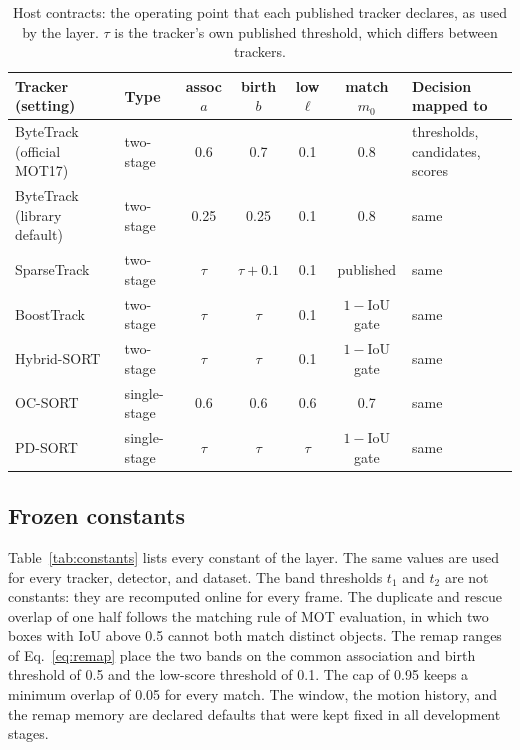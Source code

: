\documentclass[pdflatex,sn-mathphys-num,iicol]{sn-jnl}
\begin{document}
\begin{table}[t]
\caption{Host contracts: the operating point that each published tracker
declares, as used by the layer. $\tau$ is the tracker's own published
threshold, which differs between trackers.}
\label{tab:contracts}
\centering\footnotesize
\setlength{\tabcolsep}{4pt}
\begin{tabular}{@{}>{\raggedright\arraybackslash}p{30mm}lcccc>{\raggedright\arraybackslash}p{32mm}@{}}
\toprule
Tracker (setting) & Type & assoc $a$ & birth $b$ & low $\ell$ & match $m_0$ & Decision mapped to\\
\midrule
ByteTrack (official MOT17) & two-stage & 0.6 & 0.7 & 0.1 & 0.8 & thresholds, candidates, scores\\
ByteTrack (library default) & two-stage & 0.25 & 0.25 & 0.1 & 0.8 & same\\
SparseTrack & two-stage & $\tau$ & $\tau+0.1$ & 0.1 & published & same\\
BoostTrack & two-stage & $\tau$ & $\tau$ & 0.1 & $1-$IoU gate & same\\
Hybrid-SORT & two-stage & $\tau$ & $\tau$ & 0.1 & $1-$IoU gate & same\\
OC-SORT & single-stage & 0.6 & 0.6 & 0.6 & 0.7 & same\\
PD-SORT & single-stage & $\tau$ & $\tau$ & $\tau$ & $1-$IoU gate & same\\
\bottomrule
\end{tabular}
\end{table}

\subsection{Frozen constants}\label{sec:constants}
Table~\ref{tab:constants} lists every constant of the layer. The same values
are used for every tracker, detector, and dataset. The band thresholds $t_1$
and $t_2$ are not constants: they are recomputed online for every frame. The
duplicate and rescue overlap of one half follows the matching rule of MOT
evaluation, in which two boxes with IoU above 0.5 cannot both match distinct
objects. The remap ranges of Eq.~\eqref{eq:remap} place the two bands on the
common association and birth threshold of 0.5 and the low-score threshold of
0.1. The cap of 0.95 keeps a minimum overlap of 0.05 for every match. The
window, the motion history, and the remap memory are declared defaults that
were kept fixed in all development stages.
\end{document}
